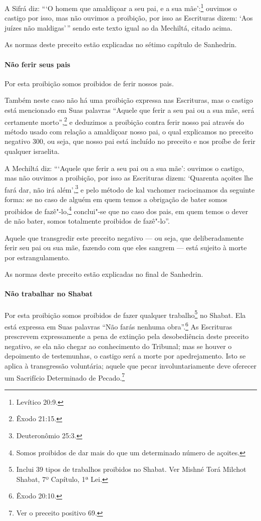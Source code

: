 \begin{multicols}{2}
A Sifrá\starr{} diz: ```O homem que amaldiçoar a seu pai, e a sua mãe':\footnote{Levítico
20:9.} ouvimos o castigo por isso, mas não ouvimos a proibição, por isso
as Escrituras dizem: `Aos juízes não maldigas'\,'' sendo este texto igual
ao da Mechiltá\starr, citado acima.

As normas deste preceito estão explicadas no sétimo capítulo de Sanhedrin\starr.

\paragraph{Não ferir seus pais}

Por esta proibição somos proibidos de ferir nossos pais.

Também neste caso não há uma proibição expressa nas Escrituras, mas o
castigo está mencionado em Suas palavras ``Aquele que ferir a seu pai ou
a sua mãe, será certamente morto'',\footnote{Êxodo 21:15.} e deduzimos a
proibição contra ferir nosso pai através do método usado com relação a
amaldiçoar nosso pai, o qual explicamos no preceito negativo 300, ou
seja, que nosso pai está incluído no preceito e nos proíbe de ferir
qualquer israelita.

A Mechiltá\starr{} diz: ```Aquele que ferir a seu pai ou a sua mãe': ouvimos o
castigo, mas não ouvimos a proibição, por isso as Escrituras dizem:
`Quarenta açoites lhe fará dar, não irá além',\footnote{Deuteronômio 25:3.} e
pelo método de kal vachomer\starr{} raciocinamos da
seguinte forma: se no caso de alguém em quem temos a obrigação de bater
somos proibidos de fazê"-lo,\footnote{Somos proibidos de dar mais do que um determinado número de açoites.} conclui"-se que no caso
dos pais, em quem temos o dever de não bater, somos totalmente
proibidos de fazê"-lo''.

Aquele que transgredir este preceito negativo --- ou seja, que deliberadamente ferir seu pai ou sua mãe, fazendo com que eles sangrem --- está sujeito à morte por estrangulamento.

As normas deste preceito estão explicadas no final de Sanhedrin\starr.

\paragraph{Não trabalhar no Shabat}

Por esta proibição somos proibidos de fazer qualquer
trabalho\footnote{Inclui 39 tipos de trabalhos proibidos no Shabat. Ver Mishné Torá\starr{}
  Milchot Shabat, 7º Capítulo, 1ª Lei.} no Shabat. Ela está expressa em Suas
palavras ``Não farás nenhuma obra''.\footnote{Êxodo 20:10.} As Escrituras
prescrevem expressamente a pena de extinção pela desobediência deste
preceito negativo, se ela não chegar ao conhecimento do Tribunal; mas se
houver o depoimento de testemunhas, o castigo será a morte por
apedrejamento. Isto se aplica à transgressão voluntária; aquele que
pecar involuntariamente deve oferecer um Sacrifício Determinado de
Pecado.\footnote{Ver o preceito positivo 69.}


\end{multicols}
